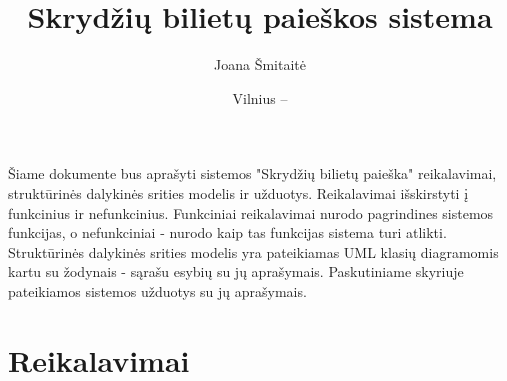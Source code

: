 \documentclass{VUMIFPSkursinis}
\title{Skrydžių bilietų paieškos sistema}
\author{Joana Šmitaitė}
\date{Vilnius – \the\year}
\begin{document}
    \maketitle
      
        \tableofcontents
      
              Šiame dokumente bus aprašyti sistemos "Skrydžių bilietų paieška" reikalavimai, struktūrinės dalykinės srities modelis ir užduotys. Reikalavimai išskirstyti į funkcinius ir nefunkcinius. Funkciniai reikalavimai nurodo pagrindines sistemos funkcijas, o nefunkciniai - nurodo kaip tas funkcijas sistema turi atlikti. Struktūrinės dalykinės srities modelis yra pateikiamas UML klasių diagramomis kartu su žodynais - sąrašu esybių su jų aprašymais. Paskutiniame skyriuje pateikiamos sistemos užduotys su jų aprašymais.
        \section{Reikalavimai}
\end{document}
